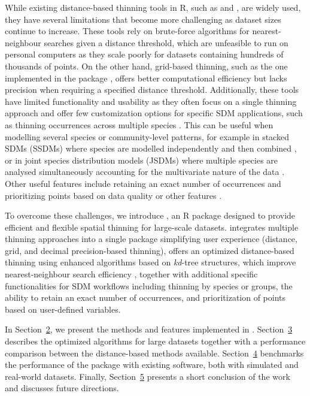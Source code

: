 While existing distance-based thinning tools in R, such as  \citep{aiello2015spthin} and  \citep{smith2023including}, are widely used, they have several limitations that become more challenging as dataset sizes continue to increase. These tools rely on brute-force algorithms for nearest-neighbour searches given a distance threshold, which are unfeasible to run on personal computers as they scale poorly for datasets containing hundreds of thousands of points. On the other hand, grid-based thinning, such as the one implemented in the  package \citep{dismoRpackage}, offers better computational efficiency but lacks precision when requiring a specified distance threshold. Additionally, these tools have limited functionality and usability as they often focus on a single thinning approach and offer few customization options for specific SDM applications, such as thinning occurrences across multiple species \citep{noori2024window}. This can be useful when modelling several species or community-level patterns, for example in stacked SDMs (SSDMs) where species are modelled independently and then combined \citep{calabrese2014stacking}, or in joint species distribution models (JSDMs) where multiple species are analysed simultaneously accounting for the multivariate nature of the data \citep{pollock2014understanding, ovaskainen2017make, ovaskainen2020joint}. Other useful features include retaining an exact number of occurrences \citep{steen2021spatial} and prioritizing points based on data quality or other features \citep{yu2023future}.

To overcome these challenges, we introduce  \citep{geothinner2025}, an R package designed to provide efficient and flexible spatial thinning for large-scale datasets.  integrates multiple thinning approaches into a single package simplifying user experience (distance, grid, and decimal precision-based thinning), offers an optimized distance-based thinning using enhanced algorithms based on \emph{kd}-tree structures, which improve nearest-neighbour search efficiency \citep{friedman1975algorithm}, together with additional specific functionalities for SDM workflows including thinning by species or groups, the ability to retain an exact number of occurrences, and prioritization of points based on user-defined variables.

In Section~\hyperref[packagedescription]{2}, we present the methods and features implemented in . Section~\hyperref[modifiedthinning]{3} describes the optimized algorithms for large datasets together with a performance comparison between the distance-based methods available. Section~\hyperref[performancethinning]{4} benchmarks the performance of the package with existing software, both with simulated and real-world datasets. Finally, Section~\hyperref[conclusions]{5} presents a short conclusion of the work and discusses future directions.

